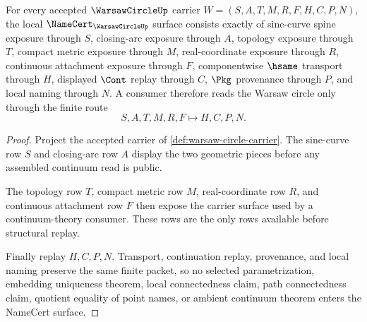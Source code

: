 \begin{theorem}
\label{thm:warsaw-circle-namecert-obligations}
For every accepted $\WarsawCircleUp$ carrier $W=(S,A,T,M,R,F,H,C,P,N)$, the local $\NameCert_{\WarsawCircleUp}$ surface consists exactly of sine-curve spine exposure through $S$, closing-arc exposure through $A$, topology exposure through $T$, compact metric exposure through $M$, real-coordinate exposure through $R$, continuous attachment exposure through $F$, componentwise $\hsame$ transport through $H$, displayed $\Cont$ replay through $C$, $\Pkg$ provenance through $P$, and local naming through $N$. A consumer therefore reads the Warsaw circle only through the finite route
$$
S,A,T,M,R,F \longmapsto H,C,P,N .
$$
\end{theorem}
\begin{proof}
Project the accepted carrier of \autoref{def:warsaw-circle-carrier}. The sine-curve row $S$ and closing-arc row $A$ display the two geometric pieces before any assembled continuum read is public.

The topology row $T$, compact metric row $M$, real-coordinate row $R$, and continuous attachment row $F$ then expose the carrier surface used by a continuum-theory consumer. These rows are the only rows available before structural replay.

Finally replay $H,C,P,N$. Transport, continuation replay, provenance, and local naming preserve the same finite packet, so no selected parametrization, embedding uniqueness theorem, local connectedness claim, path connectedness claim, quotient equality of point names, or ambient continuum theorem enters the NameCert surface.
\end{proof}

